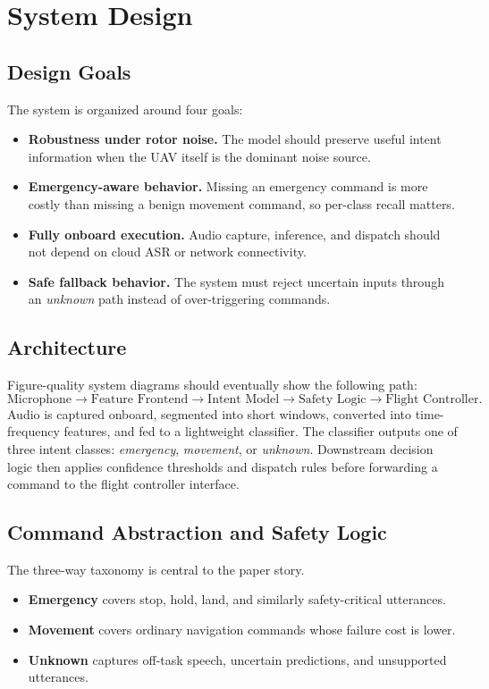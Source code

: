 \section{System Design}
\label{sec:system}

\subsection{Design Goals}

The system is organized around four goals:
\begin{itemize}
\item \textbf{Robustness under rotor noise.} The model should preserve useful intent information when the UAV itself is the dominant noise source.
\item \textbf{Emergency-aware behavior.} Missing an emergency command is more costly than missing a benign movement command, so per-class recall matters.
\item \textbf{Fully onboard execution.} Audio capture, inference, and dispatch should not depend on cloud ASR or network connectivity.
\item \textbf{Safe fallback behavior.} The system must reject uncertain inputs through an \emph{unknown} path instead of over-triggering commands.
\end{itemize}

\subsection{Architecture}

Figure-quality system diagrams should eventually show the following path:
\[
\text{Microphone} \rightarrow \text{Feature Frontend} \rightarrow \text{Intent Model} \rightarrow \text{Safety Logic} \rightarrow \text{Flight Controller}.
\]
Audio is captured onboard, segmented into short windows, converted into time-frequency features, and fed to a lightweight classifier. The classifier outputs one of three intent classes: \emph{emergency}, \emph{movement}, or \emph{unknown}. Downstream decision logic then applies confidence thresholds and dispatch rules before forwarding a command to the flight controller interface.

\subsection{Command Abstraction and Safety Logic}

The three-way taxonomy is central to the paper story.
\begin{itemize}
\item \textbf{Emergency} covers stop, hold, land, and similarly safety-critical utterances.
\item \textbf{Movement} covers ordinary navigation commands whose failure cost is lower.
\item \textbf{Unknown} captures off-task speech, uncertain predictions, and unsupported utterances.
\end{itemize}


